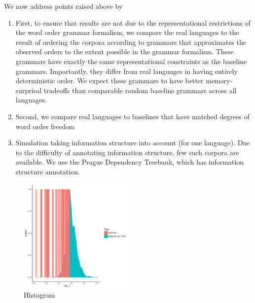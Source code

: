 

We now address points raised above by 



\begin{enumerate}
\item First, to ensure that results are not due to the representational restrictions of the word order grammar formalism, we compare the real languages to the result of ordering the corpora according to grammars that approximates the observed orders to the extent possible in the grammar formalism.
These grammars have exactly the same representational constraints as the baseline grammars.
Importantly, they differ from real languages in having entirely deterministic order.
We expect these grammars to have better memory-surprisal tradeoffs than comparable random baseline grammars across all languages.

\item Second, we compare real languages to baselines that have matched degrees of word order freedom

\item Simulation taking information structure into account (for one language).
Due to the difficulty of annotating information structure, few such corpora are available.
We use the Prague Dependency Treebank, which has information structure annotation.
\end{enumerate}



\begin{figure}
\includegraphics[width=0.5\textwidth]{figures/full-GROUND-listener-surprisal-memory-HIST_z_byMem_onlyWordForms_boundedVocab.pdf}
	\caption{Histogram}\label{fig:hist-real}
\end{figure}

